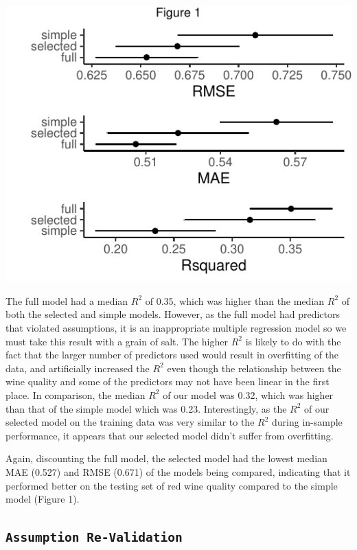 \documentclass[letterpaper,8pt,twocolumn,twoside,]{pinp}
\begin{document}
\begin{center}\includegraphics{DATA2002_ExecutiveSummary_files/figure-latex/unnamed-chunk-2-1} \end{center}

The full model had a median \(R^2\) of 0.35, which was higher than the
median \(R^2\) of both the selected and simple models. However, as the
full model had predictors that violated assumptions, it is an
inappropriate multiple regression model so we must take this result with
a grain of salt. The higher \(R^2\) is likely to do with the fact that
the larger number of predictors used would result in overfitting of the
data, and artificially increased the \(R^2\) even though the
relationship between the wine quality and some of the predictors may not
have been linear in the first place. In comparison, the median \(R^2\)
of our model was 0.32, which was higher than that of the simple model
which was 0.23. Interestingly, as the \(R^2\) of our selected model on
the training data was very similar to the \(R^2\) during in-sample
performance, it appears that our selected model didn't suffer from
overfitting.

Again, discounting the full model, the selected model had the lowest
median MAE (0.527) and RMSE (0.671) of the models being compared,
indicating that it performed better on the testing set of red wine
quality compared to the simple model (Figure 1).

\hypertarget{assumption-re-validation}{%
\subsection{\texorpdfstring{\texttt{Assumption\ Re-Validation}}{Assumption Re-Validation}}\label{assumption-re-validation}}
\end{document}
